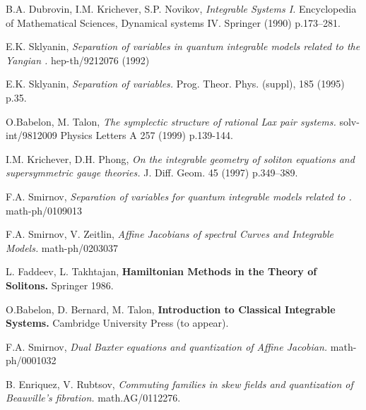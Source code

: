 \documentclass[a4paper,11pt]{article}
\begin{document}
\begin{thebibliography}{XXXXX}

 B.A. Dubrovin, I.M. Krichever, S.P. Novikov,
{\it Integrable Systems I.} Encyclopedia of Mathematical Sciences, 
Dynamical systems IV. Springer (1990) p.173--281.


 E.K. Sklyanin, {\it Separation of variables
in quantum integrable models related to the Yangian \coordHE{}.}
hep-th/9212076 (1992)

 E.K. Sklyanin, {\it Separation of variables.}
Prog. Theor. Phys. (suppl), 185 (1995) p.35.

 O.Babelon, M. Talon, {\it The symplectic
structure of rational Lax pair systems.}
solv-int/9812009 Physics Letters A 257 (1999) p.139-144.

 I.M. Krichever, D.H. Phong, {\it On the
integrable geometry of soliton equations and \coordHE{} supersymmetric
gauge theories.} J. Diff. Geom. 45 (1997) p.349--389.

 F.A. Smirnov, {\it Separation of variables
for quantum integrable models related to \coordHE{}.}
math-ph/0109013

  F.A. Smirnov, V. Zeitlin, {\it Affine Jacobians of spectral Curves
and Integrable Models.} math-ph/0203037

 L. Faddeev, L. Takhtajan, {\bf Hamiltonian Methods in the Theory
of Solitons.} Springer 1986.

 O.Babelon, D. Bernard, M. Talon, {\bf Introduction to Classical Integrable Systems.} Cambridge University Press  (to appear).

 F.A. Smirnov, {\it Dual Baxter equations and quantization of Affine Jacobian.}
math-ph/0001032

 B. Enriquez, V. Rubtsov, {\it Commuting families in skew fields and
quantization of Beauville's fibration.} math.AG/0112276.


\end{thebibliography}
 
\end{document}
